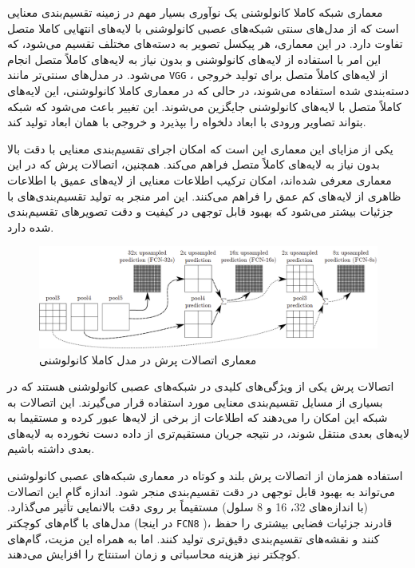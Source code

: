 معماری شبکه کاملا کانولوشنی
\cite{long2015fully}
یک نوآوری بسیار مهم در زمینه تقسیم‌بندی معنایی است که از مدل‌های سنتی شبکه‌های عصبی کانولوشنی با لایه‌های انتهایی کاملا متصل تفاوت دارد. در این معماری، هر پیکسل تصویر به دسته‌های مختلف تقسیم می‌شود، که این امر با استفاده از لایه‌های کانولوشنی و بدون نیاز به لایه‌های کاملاً
متصل انجام می‌شود. در مدل‌های سنتی‌تر مانند
\verb*|VGG|
\cite{simonyan2014very}
، از لایه‌های کاملاً متصل برای تولید خروجی دسته‌بندی شده استفاده می‌شوند، در حالی که در معماری کاملا کانولوشنی، این لایه‌های کاملاً متصل با لایه‌های کانولوشنی جایگزین می‌شوند. این تغییر باعث می‌شود که شبکه بتواند تصاویر ورودی با ابعاد دلخواه را بپذیرد و خروجی با همان ابعاد تولید کند.

یکی از مزایای این معماری این است که امکان اجرای تقسیم‌بندی معنایی با دقت بالا بدون نیاز به لایه‌های کاملاً متصل فراهم می‌کند. همچنین، اتصالات پرش
\cite{drozdzal2016importance}
که در این معماری معرفی شده‌اند، امکان ترکیب اطلاعات معنایی از لایه‌های عمیق با اطلاعات ظاهری از لایه‌های کم عمق را فراهم می‌کنند. این امر منجر به تولید تقسیم‌بندی‌های با جزئیات بیشتر می‌شود که بهبود قابل توجهی در کیفیت و دقت تصویرهای تقسیم‌بندی شده دارد.

\begin{figure}[ht]
	\includegraphics[width=\linewidth, height=0.2\textheight]{Images/Chapter2/FCN.png}
	\centering
	\caption{معماری اتصالات پرش در مدل کاملا کانولوشنی}
	\label{fig:fig5}
\end{figure}

اتصالات پرش یکی از ویژگی‌های کلیدی در شبکه‌های عصبی کانولوشنی
هستند که در بسیاری از مسایل تقسیم‌بندی معنایی مورد استفاده قرار می‌گیرند. این اتصالات به شبکه این امکان را می‌دهند که اطلاعات از برخی از لایه‌ها عبور کرده و  مستقیما به لایه‌های بعدی منتقل شوند، در نتیجه جریان مستقیم‌تری از داده دست نخورده به لایه‌های بعدی داشته باشیم.

استفاده همزمان از اتصالات پرش بلند و کوتاه در معماری شبکه‌های عصبی کانولوشنی می‌تواند به بهبود قابل توجهی در دقت تقسیم‌بندی منجر شود. اندازه گام این اتصالات (با اندازه‌های 32، 16 و 8 سلول) مستقیماً بر روی دقت بالانمایی تأثیر می‌گذارد. مدل‌های با گام‌های کوچکتر (در اینجا
\verb*|FCN8|
)، قادرند جزئیات فضایی بیشتری را حفظ کنند و نقشه‌های تقسیم‌بندی دقیق‌تری تولید کنند. اما به همراه این مزیت، گام‌های کوچکتر نیز هزینه محاسباتی
و زمان استنتاج
را افزایش می‌دهند.

